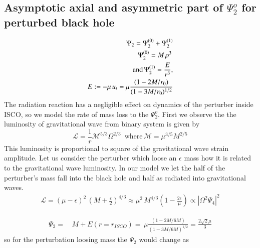 \documentclass[prd,preprintnumbers,onecolumn,eqsecnum,floatfix,letter]{revtex4}
\begin{document}
\subsection{Asymptotic axial and asymmetric part of $\Psi^{o}_{2}$ for perturbed black hole }
\begin{align}
	\Psi_{2}  = \Psi^{(0)}_{2} + 	\Psi^{(1)}_{2} \nonumber \\
	 \, \Psi^{(0)}_{2}  = M\,\rho^{3} \, \nonumber \\ \text{and} \, \Psi^{(1)}_{2}  = \frac{E}{r^{3}},\\ \space E := -\mu\, u_{t} = \mu\frac{(1- 2 M/r_{0})}{(1- 3M/r_{0})^{1/2}}
\end{align}
The radiation reaction has a negligible effect on dynamics of the perturber inside ISCO, so we model the rate of mass loss to the $\Psi^{o}_{2}$. First we observe  the the luminosity of gravitational wave from binary system is given by
\begin{equation}
	\mathcal{L} = \frac{1}{r}\mathcal{M}^{5/3}\Omega^{2/3} \, \text{ where} \, \mathcal{M} = \mu^{3/5}M^{2/5}
\end{equation}
This luminosity is proportional to square of the gravitational wave strain amplitude. Let us consider the perturber which loose an $\epsilon$ mass how it is related to the gravitational wave luminosity. In our model we let the half of the perturber's mass fall into the black hole and half as radiated into gravitational waves.  
\begin{align}
	\mathcal{L} = (\mu-\epsilon)^{2}\,(M+\frac{\epsilon}{2})^{4/3} \approx \mu^{2}\,M^{4/3}\left(1- \frac{2\epsilon}{\mu}\right) \propto |\Omega^{2}\Psi_{4}|^{2}
\end{align}

\begin{align}
	\Psi_{2} = & \, M + E(r = r_{ISCO}) = \, \mu\frac{(1-2M/6M)}{(1-3M/6M)^{1/2}} = \frac{2\sqrt{2}\mu}{3}
\end{align}
so for the perturbation loosing mass the  $\Psi_{2}$ would change as
\end{document}
